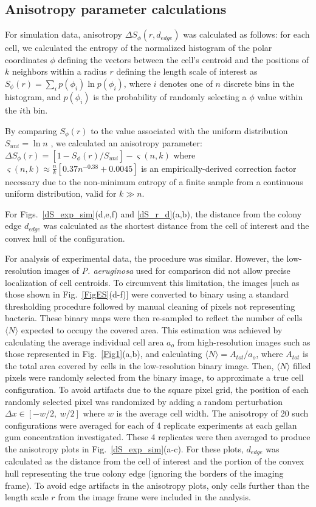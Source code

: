 \documentclass[aps,prl,numerical,reprint,superscriptaddress,showpacs]{revtex4-1}
\begin{document}
\subsection{Anisotropy parameter calculations}
For simulation data, anisotropy $\Delta S_{\phi}(r, d_{edge})$ was calculated as follows: for each cell, we calculated the entropy of the normalized histogram of the polar coordinates $\phi$ defining the vectors between the cell's centroid and the positions of $k$ neighbors within a radius $r$ defining the length scale of interest as $S_{\phi}(r) = \sum_{i}{p(\phi_{i}) \ln p(\phi_i)}$, where $i$ denotes one of $n$ discrete bins in the histogram, and $p(\phi_i)$ is the probability of randomly selecting a $\phi$ value within the $i$th bin. 

By comparing $S_{\phi}(r)$ to the value associated with the uniform distribution $S_{uni} = \ln n$ , we calculated an anisotropy parameter: $\Delta S_{\phi}(r) = [1 - S_{\phi}(r)/S_{uni}] - \varsigma(n, k)$ where $\varsigma(n, k) \approx \frac{n}{k}[0.37n^{-0.38} + 0.0045]$ is an empirically-derived correction factor necessary due to the non-minimum entropy of a finite sample from a continuous uniform distribution, valid for $k \gg n$. 

For Figs.~\ref{dS_exp_sim}(d,e,f) and \ref{dS_r_d}(a,b), the distance from the colony edge $d_{edge}$ was calculated as the shortest distance from the cell of interest and the convex hull of the configuration. 

For analysis of experimental data, the procedure was similar. However, the low-resolution images of {\it P. aeruginosa} used for comparison did not allow precise localization of cell centroids. To circumvent this limitation, the images [such as those shown in Fig.~\ref{FigES}(d-f)] were converted to binary using a standard thresholding procedure followed by manual cleaning of pixels not representing bacteria. These binary maps were then re-sampled to reflect the number of cells $\langle N \rangle$ expected to occupy the covered area. This estimation was achieved by calculating the average individual cell area $a_o$ from high-resolution images such as those represented in Fig.~\ref{Fig1}(a,b), and calculating $\langle N \rangle = A_{tot} / a_o$, where $A_{tot}$ is the total area covered by cells in the low-resolution binary image. Then, $\langle N \rangle$ filled pixels were randomly selected from the binary image, to approximate a true cell configuration. To avoid artifacts due to the square pixel grid, the position of each randomly selected pixel was randomized by adding a random perturbation $\Delta x \in [-w/2, ~w/2]$ where $w$ is the average cell width. The anisotropy of 20 such configurations were averaged for each of 4 replicate experiments at each gellan gum concentration investigated. These 4 replicates were then averaged to produce the anisotropy plots in Fig.~\ref{dS_exp_sim}(a-c). For these plots, $d_{edge}$ was calculated as the distance from the cell of interest and the portion of the convex hull representing the true colony edge (ignoring the borders of the imaging frame). To avoid edge artifacts in the anisotropy plots, only cells further than the length scale $r$ from the image frame were included in the analysis.  
\end{document}
